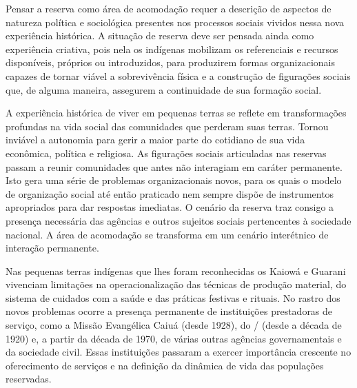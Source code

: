 {{Pensar a reserva como área de acomodação requer a descrição de aspectos
de natureza política e sociológica presentes nos processos sociais
vividos nessa nova experiência histórica. A situação de reserva deve
ser pensada ainda como experiência criativa, pois nela os indígenas
mobilizam os referenciais e recursos disponíveis, próprios ou
introduzidos, para produzirem formas organizacionais capazes de tornar
viável a sobrevivência física e a construção de figurações sociais que,
de alguma maneira, assegurem a continuidade de sua formação social. 

A experiência histórica de viver em pequenas terras se reflete em
transformações profundas na vida social das comunidades que perderam
suas terras. Tornou inviável a autonomia para gerir a maior parte do
cotidiano de sua vida econômica, política e religiosa. As figurações
sociais articuladas nas reservas passam a reunir comunidades que antes
não interagiam em caráter permanente. Isto gera uma série de problemas
organizacionais novos, para os quais o modelo de organização social até
então praticado nem sempre dispõe de instrumentos apropriados para dar
respostas imediatas. O cenário da reserva traz consigo a presença necessária das
agências e outros sujeitos sociais pertencentes à sociedade nacional. A
área de acomodação se transforma em um cenário interétnico de interação
permanente.

Nas pequenas terras indígenas que lhes foram reconhecidas os Kaiowá e
Guarani vivenciam limitações na operacionalização das técnicas de
produção material, do sistema de cuidados com a saúde e das práticas
festivas e rituais. No rastro dos novos problemas ocorre a presença
permanente de instituições prestadoras de serviço, como a Missão
Evangélica Caiuá (desde 1928), do / (desde a década de 1920) e,
a partir da década de 1970, de várias outras agências governamentais e
da sociedade civil. Essas instituições passaram a exercer importância
crescente no oferecimento de serviços e na definição da dinâmica de
vida das populações reservadas.

}}
